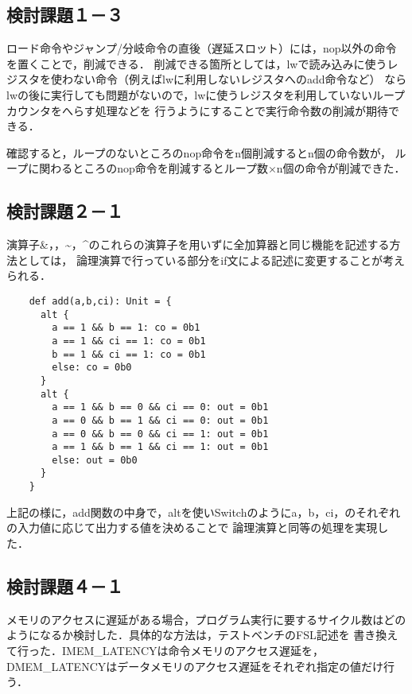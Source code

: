 \documentclass{jarticle}[11pt]
\begin{document}
  \subsection{検討課題１－３}

  ロード命令やジャンプ/分岐命令の直後（遅延スロット）には，nop以外の命令を置くことで，削減できる．
  削減できる箇所としては，lwで読み込みに使うレジスタを使わない命令（例えばlwに利用しないレジスタへのadd命令など）
  ならlwの後に実行しても問題がないので，lwに使うレジスタを利用していないループカウンタをへらす処理などを
  行うようにすることで実行命令数の削減が期待できる．

  確認すると，ループのないところのnop命令をn個削減するとn個の命令数が，
  ループに関わるところのnop命令を削減するとループ数×n個の命令が削減できた．

  \subsection{検討課題２－１}

  演算子\&，\textbar，\textasciitilde，\textasciicircum のこれらの演算子を用いずに全加算器と同じ機能を記述する方法としては，
  論理演算で行っている部分をif文による記述に変更することが考えられる．

  \begin{verbatim}
    def add(a,b,ci): Unit = {
      alt {
        a == 1 && b == 1: co = 0b1
        a == 1 && ci == 1: co = 0b1
        b == 1 && ci == 1: co = 0b1
        else: co = 0b0
      }
      alt {
        a == 1 && b == 0 && ci == 0: out = 0b1
        a == 0 && b == 1 && ci == 0: out = 0b1
        a == 0 && b == 0 && ci == 1: out = 0b1
        a == 1 && b == 1 && ci == 1: out = 0b1
        else: out = 0b0
      }
    }
  \end{verbatim}

  上記の様に，add関数の中身で，altを使いSwitchのようにa，b，ci，のそれぞれの入力値に応じて出力する値を決めることで
  論理演算と同等の処理を実現した．

  \subsection{検討課題４－１}

  メモリのアクセスに遅延がある場合，プログラム実行に要するサイクル数はどのようになるか検討した．具体的な方法は，テストベンチのFSL記述を
  書き換えて行った．IMEM\_LATENCYは命令メモリのアクセス遅延を，DMEM\_LATENCYはデータメモリのアクセス遅延をそれぞれ指定の値だけ行う．
\end{document}
